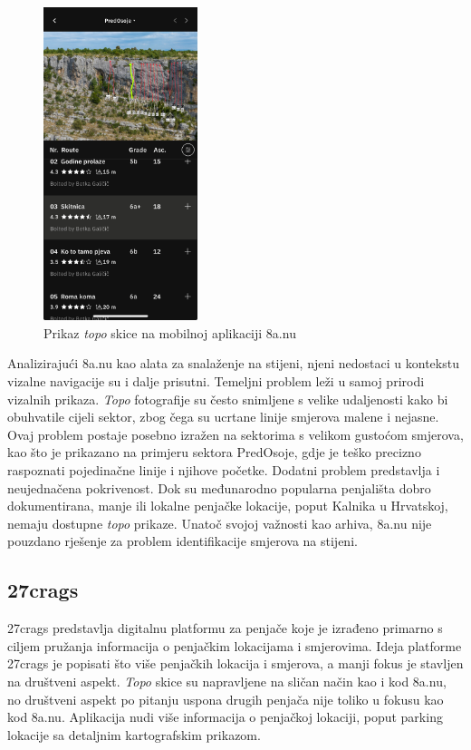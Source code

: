 \begin{figure}[H]
    \centering
    \includegraphics[width=0.4\textwidth]{images/analiza/8anu_mobile.jpg}
    \caption{Prikaz \textit{topo} skice na mobilnoj aplikaciji 8a.nu}
\end{figure}


Analizirajući 8a.nu kao alata za snalaženje na stijeni, njeni nedostaci u kontekstu vizalne navigacije su i dalje prisutni. Temeljni problem leži u samoj prirodi vizalnih prikaza. \textit{Topo} fotografije su često snimljene s velike udaljenosti kako bi obuhvatile cijeli sektor, zbog čega su ucrtane linije smjerova malene i nejasne. Ovaj problem postaje posebno izražen na sektorima s velikom gustoćom smjerova, kao što je prikazano na primjeru sektora PredOsoje, gdje je teško precizno raspoznati pojedinačne linije i njihove početke. Dodatni problem predstavlja i neujednačena pokrivenost. Dok su međunarodno popularna penjališta dobro dokumentirana, manje ili lokalne penjačke lokacije, poput Kalnika u Hrvatskoj, nemaju dostupne \textit{topo} prikaze. Unatoč svojoj važnosti kao arhiva, 8a.nu nije pouzdano rješenje za problem identifikacije smjerova na stijeni.

\subsection{27crags}

27crags predstavlja digitalnu platformu za penjače koje je izrađeno primarno s ciljem pružanja informacija o penjačkim lokacijama i smjerovima. Ideja platforme 27crags je popisati što više penjačkih lokacija i smjerova, a manji fokus je stavljen na društveni aspekt. \textit{Topo} skice su napravljene na sličan način kao i kod 8a.nu, no društveni aspekt po pitanju uspona drugih penjača nije toliko u fokusu kao kod 8a.nu. Aplikacija nudi više informacija o penjačkoj lokaciji, poput parking lokacije sa detaljnim kartografskim prikazom.

